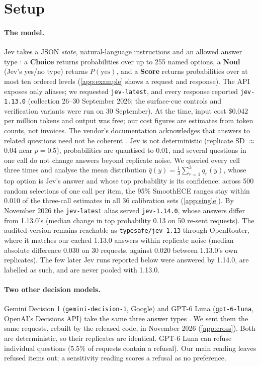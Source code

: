 \documentclass[10pt,twocolumn]{article}
\begin{document}
\section{Setup}
\label{sec:setup}

\paragraph{The model.}
Jev takes a JSON \emph{state}, natural-language instructions and an allowed
answer type \citep{typesafe2026api}: a \textbf{Choice} returns probabilities
over up to 255 named options, a \textbf{Noul} (Jev's yes/no type) returns
$P(\text{yes})$, and a \textbf{Score} returns probabilities over at most ten
ordered levels (\cref{app:example} shows a request and response). The API
exposes only aliases; we requested \texttt{jev-latest}, and every response
reported \texttt{jev-1.13.0} (collection 26--30 September 2026; the surface-cue controls and verification variants were run on 30 September). At the time,
input cost \$0.042 per million tokens and output was free; our cost figures
are estimates from token counts, not invoices. The vendor's documentation
acknowledges that answers to related questions need not be coherent
\citep{typesafe2026jaggedness}. Jev is not deterministic (replicate SD $\approx$
0.04 near $p=0.5$), probabilities are quantised to 0.01, and several questions
in one call do not change answers beyond replicate noise. We queried every
cell three times and analyse the mean distribution
$\bar q(y)=\tfrac13\sum_{r=1}^{3}q_r(y)$, whose top option is Jev's answer and
whose top probability is its confidence; across 500 random
selections of one call per item, the 95\% SmoothECE ranges stay within 0.010
of the three-call estimates in all 36 calibration sets (\cref{app:single}).
By November 2026 the \texttt{jev-latest} alias served \texttt{jev-1.14.0},
whose answers differ from 1.13.0's (median change in top probability 0.13
on 50 re-sent requests). The audited version remains reachable as
\texttt{typesafe/jev-1.13} through OpenRouter, where it matches our cached
1.13.0 answers within replicate noise (median absolute difference 0.030 on
30 requests, against 0.020 between 1.13.0's own replicates). The few later
Jev runs reported below were answered by 1.14.0, are labelled as such, and
are never pooled with 1.13.0.

\paragraph{Two other decision models.} Gemini Decision 1
(\texttt{gemini-decision-1}, Google) and GPT-6 Luna (\texttt{gpt-6-luna},
OpenAI's Decisions API) take the same three answer types
\citep{google2026geminidecision,openai2026decisions}. We sent them the same
requests, rebuilt by the released code, in November 2026 (\cref{app:cross}).
Both are deterministic, so their replicates are identical. GPT-6 Luna can
refuse individual questions (5.5\% of requests contain a refusal). Our main
reading leaves refused items out; a sensitivity reading scores a refusal as
no preference.
\end{document}
